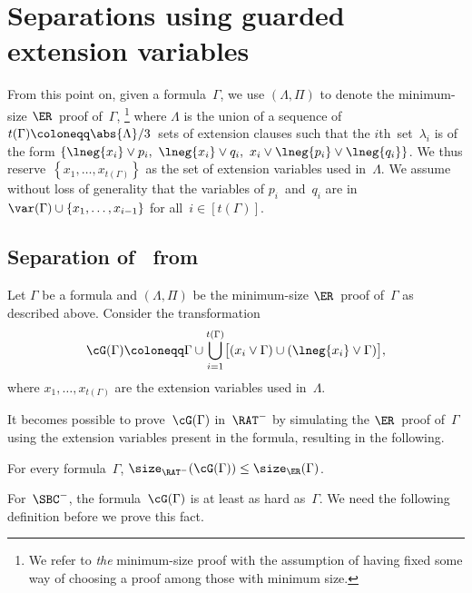 \documentclass[10pt,a4paper]{article}
\begin{document}
\section{Separations using guarded extension variables}
\label{sec:separations-using-guarded-extension-variables}

From this point on, given a formula~$\Gamma$, we use $(\Lambda, \Pi)$
to denote the minimum-size $\ER$~proof of~$\Gamma$,%
\footnote{We refer to \emph{the} minimum-size proof
  with the assumption of having fixed some way
  of choosing a proof among those with minimum size.}
where $\Lambda$ is the union of a sequence of
$t(\Gamma) \coloneqq \abs{\Lambda}/3$~sets of extension clauses
such that the $i$th~set~$\lambda_i$ is of the form
$\{\lneg{x_i} \lor p_i,\ \lneg{x_i} \lor q_i,\ x_i \lor \lneg{p_i} \lor \lneg{q_i}\}$.
We thus reserve~$\left\{x_1, \dots, x_{t(\Gamma)}\right\}$
as the set of extension variables used in~$\Lambda$.
We assume without loss of generality
that the variables of $p_i$~and~$q_i$ are
in~$\var(\Gamma) \cup \{x_1, \dots, x_{i-1}\}$ for all~$i \in [t(\Gamma)]$.

\subsection{Separation of~ from~}
\label{sec:RAT-from-SBC}

Let $\Gamma$ be a formula and $(\Lambda, \Pi)$ be
the minimum-size $\ER$~proof of~$\Gamma$ as described above.
Consider the transformation
\begin{equation}\label{eq:unsatisfiable-projection-transformation}
  \cG(\Gamma) \coloneqq \Gamma
  \cup \bigcup_{i = 1}^{t(\Gamma)} \bigl[
  (x_i \lor \Gamma)
  \cup (\lneg{x_i} \lor \Gamma)
  \bigr],
\end{equation}
where $x_1, \dots, x_{t(\Gamma)}$ are the extension variables used in~$\Lambda$.

It becomes possible to prove~$\cG(\Gamma)$ in~$\RAT^-$
by simulating the $\ER$~proof of~$\Gamma$
using the extension variables present in the formula,
resulting in the following.

\begin{lemma}[{\cite[Lemma~5.1]{YH23}}]\label{thm:projection-easy-for-RAT}
  For every formula~$\Gamma$,
  $\size_{\RAT^-}(\cG(\Gamma)) \leq \size_{\ER}(\Gamma)$.
\end{lemma}

For~$\SBC^-$, the formula~$\cG(\Gamma)$ is at least as hard as~$\Gamma$.
We need the following definition before we prove this fact.
\end{document}
